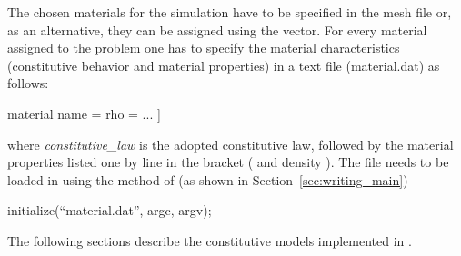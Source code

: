 The chosen materials for the simulation have to be specified in the
mesh file or, as an alternative, they can be assigned using the
 vector.  For every material assigned to the
problem one has to specify the material characteristics (constitutive
behavior and material properties) in a text file (\eg material.dat) as
follows:
\begin{cpp}
  material %
  name = %
  rho = %
  ...
  ]
\end{cpp}
 where \emph{constitutive\_law} is the
adopted constitutive law, followed by the material properties listed
one by line in the bracket (\eg {} and density
). The file needs to be loaded in \akantu using the
 method of \akantu (as shown in Section~\ref{sec:writing_main})
\begin{cpp}
initialize(``material.dat'', argc, argv);
\end{cpp}
The following sections describe the constitutive models
implemented in \akantu.


